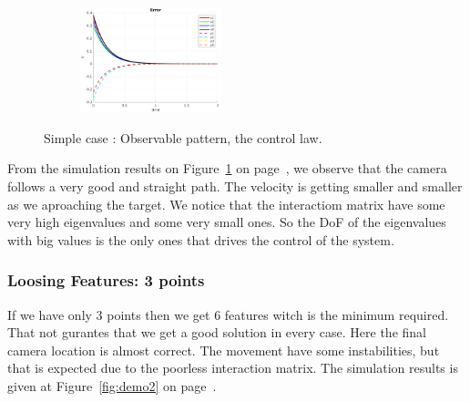 \documentclass[a4paper,12pt]{article}
\begin{document}
\begin{figure}[t!]
\begin{subfigure}[b]{0.2\textwidth}
		 \end{subfigure}%
         \begin{subfigure}[b]{0.32\textwidth}
        	\centering
	        \includegraphics[height=1.2in]{../results/Demo1-error.png}
		 \end{subfigure}%
         \caption{Simple case : Observable pattern, the control law.}
 	\label{fig:demo1}
\end{figure}
From the simulation results on Figure~\ref{fig:demo1} on page~\pageref{fig:demo1}, we observe that the camera follows a very good and straight path. The velocity is getting smaller and smaller as we aproaching the target. 
We notice that the interactiom matrix have some very high eigenvalues and some very small ones. So the DoF of the eigenvalues with big values is the only ones that drives the control of the system.

\subsubsection{Loosing Features: 3 points}
If we have only 3 points then we get 6 features witch is the minimum required. That not gurantes that we 
get a good solution in every case. Here the final camera location is almost correct. The movement have some instabilities, but that is expected due to the poorless interaction matrix. The simulation results is given at Figure~\ref{fig:demo2} on page~\pageref{fig:demo2}.
\end{document}
